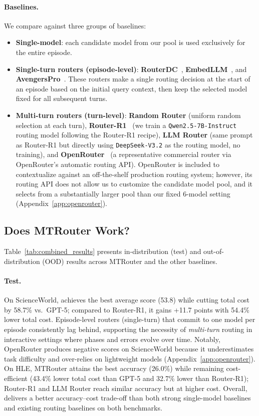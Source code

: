 \paragraph{Baselines.}
We compare against three groups of baselines:
\begin{itemize}[nolistsep, noitemsep, leftmargin=*]
\item \textbf{Single-model}: each candidate model from our pool is used exclusively for the entire episode.
\item \textbf{Single-turn routers (episode-level)}: \textbf{RouterDC}~\citep{chen2024routerdc}, \textbf{EmbedLLM}~\citep{wang2024embedllm}, and \textbf{AvengersPro}~\citep{zhang2025avengers, zhang2025beyond}.
These routers make a single routing decision at the start of an episode based on the initial query context, then keep the selected model fixed for all subsequent turns.
\item \textbf{Multi-turn routers (turn-level)}: \textbf{Random Router} (uniform random selection at each turn), \textbf{Router-R1}~\citep{zhang2025router} (we train a \texttt{Qwen2.5-7B-Instruct} routing model following the Router-R1 recipe), \textbf{LLM Router} (same prompt as Router-R1 but directly using \texttt{DeepSeek-V3.2} as the routing model, no training), and \textbf{OpenRouter}~\citep{openrouter} (a representative commercial router via OpenRouter's automatic routing API).
OpenRouter is included to contextualize \method against an off-the-shelf production routing system; however, its routing API does not allow us to customize the candidate model pool, and it  selects from a substantially larger pool than our fixed 6-model setting (Appendix~\ref{app:openrouter}).
\end{itemize}

\subsection{Does MTRouter Work?}
\label{sec:main_results}
Table~\ref{tab:combined_results} presents in-distribution (test) and out-of-distribution (OOD) results across MTRouter and the other baselines. 
\paragraph{Test.}
On ScienceWorld, \method achieves the best average score (53.8) while cutting total cost by 58.7\% vs.\ GPT-5; compared to Router-R1, it gains +11.7 points with 54.4\% lower total cost.
Episode-level routers (single-turn) that commit to one model per episode consistently lag behind, supporting the necessity of \emph{multi-turn} routing in interactive settings where phases and errors evolve over time.
Notably, OpenRouter produces negative scores on ScienceWorld because it underestimates task difficulty and over-relies on lightweight models (Appendix~\ref{app:openrouter}).
On HLE, MTRouter attains the best accuracy (26.0\%) while remaining cost-efficient (43.4\% lower total cost than GPT-5 and 32.7\% lower than Router-R1); Router-R1 and LLM Router reach similar accuracy but at higher cost. 
Overall, \method delivers a better accuracy--cost trade-off than both strong single-model baselines and existing routing baselines on both benchmarks.

